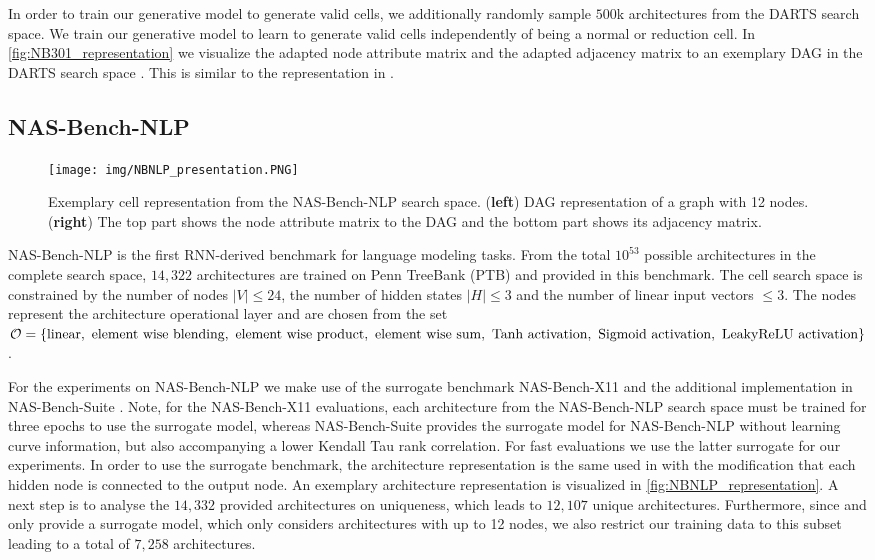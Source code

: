 \documentclass[runningheads]{llncs}
\begin{document}
In order to train our generative model to generate valid cells, we additionally randomly sample $500$k architectures from the DARTS search space. 
We train our generative model to learn to generate valid cells independently of being a normal or reduction cell. 
In \autoref{fig:NB301_representation} we visualize the adapted node attribute matrix and the adapted adjacency matrix to an exemplary DAG in the DARTS search space \cite{2018DARTS}. This is similar to the representation in \cite{2020Arch2vec}.

\subsection{NAS-Bench-NLP}\label{sec:supp_rep_nbnlp}

\begin{figure*}
	\centering
	\texttt{[image: img/NBNLP\_presentation.PNG]}
	\caption{Exemplary cell representation from the NAS-Bench-NLP search space. (\textbf{left}) DAG representation of a graph with 12 nodes. (\textbf{right}) The top part shows the node attribute matrix to the DAG and the bottom part shows its adjacency matrix. \label{fig:NBNLP_representation}}
\end{figure*}
NAS-Bench-NLP \cite{2020NBNLP} is the first RNN-derived benchmark for language modeling tasks. From the total $10^{53}$ possible architectures in the complete search space, $14,322$ architectures are trained on Penn TreeBank \cite{2010PTB} (PTB) and provided in this benchmark. The cell search space is constrained by the number of nodes $\vert V \vert \leq 24$, the number of hidden states $\vert H \vert \leq 3$ and the number of linear input vectors $\leq 3$.  The nodes represent the architecture operational layer and are chosen from the set $\mathcal{O} = \{\textrm{linear}, \textrm{~element wise blending}, \textrm{~element wise product}, \\ \textrm{~element wise sum},  \textrm{~Tanh activation}, \textrm{~Sigmoid activation}, \textrm{~LeakyReLU activation}\}$.

For the experiments on NAS-Bench-NLP \cite{2020NBNLP} we make use of the surrogate benchmark NAS-Bench-X11 \cite{2021NBX11} and the additional  implementation in NAS-Bench-Suite \cite{NBSuite}. Note, for the NAS-Bench-X11 evaluations, each architecture from the NAS-Bench-NLP search space must be trained for three epochs to use the surrogate model, whereas NAS-Bench-Suite provides the surrogate model for NAS-Bench-NLP without learning curve information, but also accompanying a lower Kendall Tau rank correlation. For fast evaluations we use the latter surrogate for our experiments. In order to use the surrogate benchmark, the architecture representation is the same used in  \cite{2021NBX11} with the modification that each hidden node is connected to the output node. An exemplary architecture representation is visualized in \autoref{fig:NBNLP_representation}. A next step is to analyse the $14,332$ provided architectures on uniqueness, which leads to  $12,107$ unique architectures. Furthermore, since \cite{2021NBX11} and \cite{NBSuite} only provide a surrogate model, which only considers architectures with up to 12 nodes, we also restrict our training data to this subset leading to a total of $7,258$ architectures. 
\end{document}

